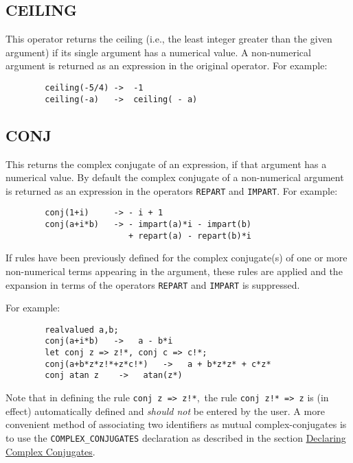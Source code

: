 \subsection{CEILING}
\hypertarget{operator:CEILING}{}
This operator returns the ceiling (i.e., the least integer greater than
the given argument) if its single argument has a numerical value.  A
non-numerical argument is returned as an expression in the original
operator.  For example:

\begin{verbatim}
        ceiling(-5/4) ->  -1
        ceiling(-a)   ->  ceiling( - a)
\end{verbatim}

\subsection{CONJ}
\hypertarget{operator:CONJ}{}
This returns the complex conjugate
of an expression, if that argument has a numerical value.  By default the
complex conjugate of a non-numerical argument is returned as an expression
in the operators
\texttt{REPART} and \texttt{IMPART}.
For example:
\begin{verbatim}
        conj(1+i)     -> - i + 1
        conj(a+i*b)   -> - impart(a)*i - impart(b)
                         + repart(a) - repart(b)*i
\end{verbatim}

If rules have been previously defined for the complex conjugate(s)
of one or more non-numerical terms appearing in the argument, these rules are
applied and the expansion in terms of the operators
\texttt{REPART} and \texttt{IMPART} is
suppressed.

For example:
\begin{verbatim}
        realvalued a,b;
        conj(a+i*b)   ->   a - b*i
        let conj z => z!*, conj c => c!*;
        conj(a+b*z*z!*+z*c!*)   ->   a + b*z*z* + c*z*
        conj atan z    ->   atan(z*)
\end{verbatim}
Note that in defining the rule \texttt{conj z => z!*},\ the rule
\texttt{conj z!*  => z} is (in effect) automatically defined and
\emph{should not} be entered by the user.  A more convenient method of
associating two identifiers as mutual complex-conjugates is to use the
\texttt{COMPLEX\_CONJUGATES} declaration as described in the section
\hyperlink{command:COMPLEX_CONJUGATES}{Declaring Complex Conjugates}.

